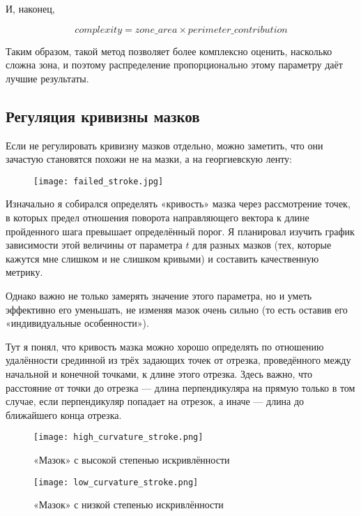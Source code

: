 И, наконец,

\begin{equation}
    complexity = zone\_area \times perimeter\_contribution
\end{equation}

Таким образом, такой метод позволяет более комплексно оценить, насколько сложна зона, и поэтому распределение пропорционально этому параметру даёт лучшие результаты.


\subsection{Регуляция кривизны мазков}\label{subsec:curvature-regulation}

Если не регулировать кривизну мазков отдельно, можно заметить,
что они зачастую становятся похожи не на мазки, а на георгиевскую ленту:

\begin{figure}[h!]
    \centering
    \texttt{[image: failed\_stroke.jpg]}
    \label{fig:failed_stroke}
\end{figure}

Изначально я собирался определять «кривость» мазка через рассмотрение точек,
в которых предел отношения поворота направляющего вектора к длине пройденного шага превышает определённый порог.
Я планировал изучить график зависимости этой величины от параметра $t$ для разных мазков
(тех, которые кажутся мне слишком и не слишком кривыми) и составить качественную метрику.

Однако важно не только замерять значение этого параметра, но и уметь эффективно его уменьшать,
не изменяя мазок очень сильно (то есть оставив его «индивидуальные особенности»).

Тут я понял, что кривость мазка можно хорошо определять по отношению удалённости срединной из трёх задающих точек от отрезка,
проведённого между начальной и конечной точками, к длине этого отрезка.
Здесь важно, что расстояние от точки до отрезка — длина перпендикуляра на прямую только в том случае,
если перпендикуляр попадает на отрезок, а иначе — длина до ближайшего конца отрезка.

\begin{figure}[h!]
    \centering
    \texttt{[image: high\_curvature\_stroke.png]}
    \caption{«Мазок» с высокой степенью искривлённости}
    \label{fig:high_curvature_stroke}
\end{figure}

\begin{figure}[h!]
    \centering
    \texttt{[image: low\_curvature\_stroke.png]}
    \caption{«Мазок» с низкой степенью искривлённости}
    \label{fig:low_curvature_stroke}
\end{figure}


